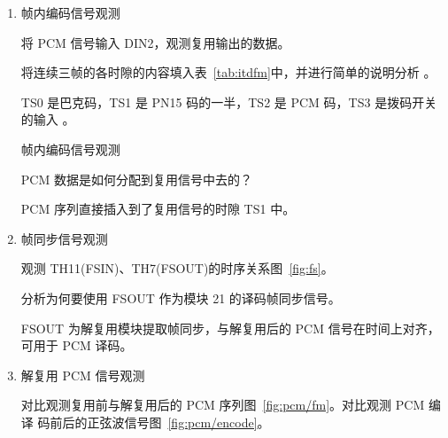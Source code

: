 \documentclass[../main]{subfiles}
\begin{document}
\begin{enumerate}
  \item 帧内编码信号观测

    将 PCM 信号输入 DIN2，观测复用输出的数据。

    \begin{Exercise}[title = 思考]
      将连续三帧的各时隙的内容填入表~\ref{tab:itdfm}中，并进行简单的说明分析
      。
    \end{Exercise}

    \begin{Answer}
      TS0 是巴克码，TS1 是 PN15 码的一半，TS2 是 PCM 码，TS3 是拨码开关的输入
      。
    \end{Answer}

    \begin{table}[htbp]
      \centering
      \caption{帧内编码信号观测}%
      \label{tab:itdfm}
    \end{table}


    \begin{Exercise}[title = 思考]
      PCM 数据是如何分配到复用信号中去的？
    \end{Exercise}

    \begin{Answer}
      PCM 序列直接插入到了复用信号的时隙 TS1 中。
    \end{Answer}

  \item 帧同步信号观测

    观测 TH11(FSIN)、TH7(FSOUT)的时序关系图~\ref{fig:fs}。

    \begin{Exercise}
      分析为何要使用 FSOUT 作为模块 21 的译码帧同步信号。
    \end{Exercise}

    \begin{Answer}
      FSOUT 为解复用模块提取帧同步，与解复用后的 PCM 信号在时间上对齐，可用于
      PCM 译码。
    \end{Answer}

  \item 解复用 PCM 信号观测

    对比观测复用前与解复用后的 PCM 序列图~\ref{fig:pcm/fm}。对比观测 PCM 编译
    码前后的正弦波信号图~\ref{fig:pcm/encode}。
\end{enumerate}
\end{document}
